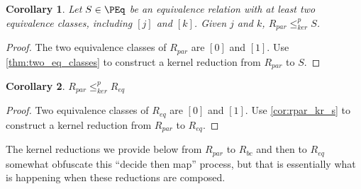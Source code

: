 \documentclass{amsart}
\newtheorem{corollary}[corollary]{Corollary}
\theoremstyle{definition} \newtheorem{definition}[definition]{Definition}
\newcommand{\kr}{\leq^{p}_{ker}} %
\begin{document}
\begin{corollary}\label{cor:rpar_kr_s}
  Let $S\in\PEq$ be an equivalence relation with at least two equivalence
  classes, including $[j]$ and $[k]$. Given $j$ and $k$, $R_{par}\kr S$.
\end{corollary}
\begin{proof}
  The two equivalence classes of $R_{par}$ are $[0]$ and $[1]$. Use
  \autoref{thm:two_eq_classes} to construct a kernel reduction from $R_{par}$
  to $S$.
\end{proof}

\begin{corollary}
  $R_{par}\kr R_{eq}$
\end{corollary}
\begin{proof}
  Two equivalence classes of $R_{eq}$ are $[0]$ and $[1]$. Use
  \autoref{cor:rpar_kr_s} to construct a kernel reduction from $R_{par}$ to
  $R_{eq}$.
\end{proof}

The kernel reductions we provide below from $R_{par}$ to $R_{bc}$ and then to
$R_{eq}$ somewhat obfuscate this ``decide then map'' process, but that is
essentially what is happening when these reductions are composed.
\end{document}
